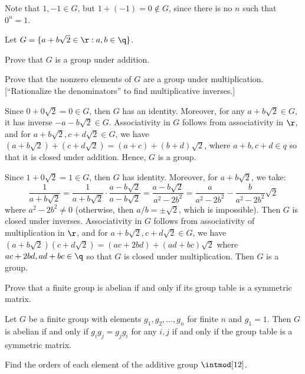 \begin{problems}
\begin{solalph}
        \item Note that $1, -1 \in G$, but $1 + (-1) = 0 \not\in G$, since there is no $n$ such that $0^n = 1$.
    \end{solalph}
    \item Let $G = \{ a + b\sqrt{2} \in \r : a, b \in \q \}$.
    \begin{problems}
        \item Prove that $G$ is a group under addition.
        \item Prove that the nonzero elements of $G$ are a group under multiplication. 
        [``Rationalize the denominators'' to find multiplicative inverses.]
    \end{problems}
    \begin{solalph}
        \item Since $0 + 0\sqrt 2 = 0 \in G$, then $G$ has an identity. Moreover, for any $a + b\sqrt2 \in G$, it has inverse $-a - b\sqrt 2 \in G$. Associativity in $G$ follows from associativity in $\r$, and for $a + b\sqrt 2, c + d\sqrt 2 \in G$, we have $(a + b\sqrt 2) + (c + d\sqrt 2) = (a + c) + (b + d)\sqrt 2$, where $a + b, c + d \in q$ so that it is closed under addition. Hence, $G$ is a group.
        \item Since $1 + 0\sqrt 2 = 1 \in G$, then $G$ has identity. Moreover, for $a + b\sqrt 2$, we take:
        $$\frac{1}{a + b\sqrt2} = \frac{1}{a + b\sqrt 2} \cdot \frac{a - b\sqrt 2}{a - b\sqrt 2} = \frac{a - b\sqrt2}{a^2 - 2b^2} = \frac a{a^2 - 2b^2} - \frac b{a^2 - 2b^2}\sqrt 2$$
        where $a^2 - 2b^2 \neq 0$ (otherwise, then $a/b = \pm\sqrt 2$, which is impossible). Then $G$ is closed under inverses. Associativity in $G$ follows from associativity of multiplication in $\r$, and for $a + b\sqrt 2, c + d\sqrt 2 \in G$, we have $(a + b\sqrt 2)(c + d\sqrt 2) = (ac + 2bd) + (ad + bc)\sqrt 2$ where $ac + 2bd, ad + bc \in \q$ so that $G$ is closed under multiplication. Then $G$ is a group.
    \end{solalph}
    \item Prove that a finite group is abelian if and only if its group table is a symmetric matrix.
    \begin{sol}
        Let $G$ be a finite group with elements $g_1, g_2, \ldots, g_n$ for finite $n$ and $g_1 = 1$. Then $G$ is abelian if and only if $g_ig_j = g_jg_i$ for any $i, j$ if and only if the group table is a symmetric matrix. 
    \end{sol}
    \item Find the orders of each element of the additive group $\intmod[12]$.

\end{problems}
